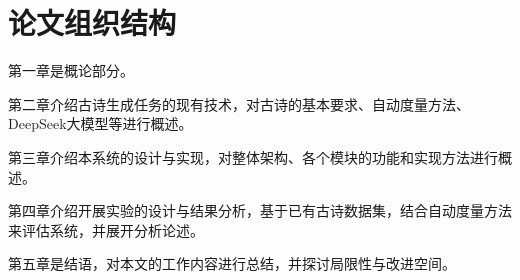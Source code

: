 \section{论文组织结构}

    第一章是概论部分。
    
    第二章介绍古诗生成任务的现有技术，对古诗的基本要求、自动度量方法、DeepSeek大模型等进行概述。

    第三章介绍本系统的设计与实现，对整体架构、各个模块的功能和实现方法进行概述。

    第四章介绍开展实验的设计与结果分析，基于已有古诗数据集，结合自动度量方法来评估系统，并展开分析论述。

    第五章是结语，对本文的工作内容进行总结，并探讨局限性与改进空间。